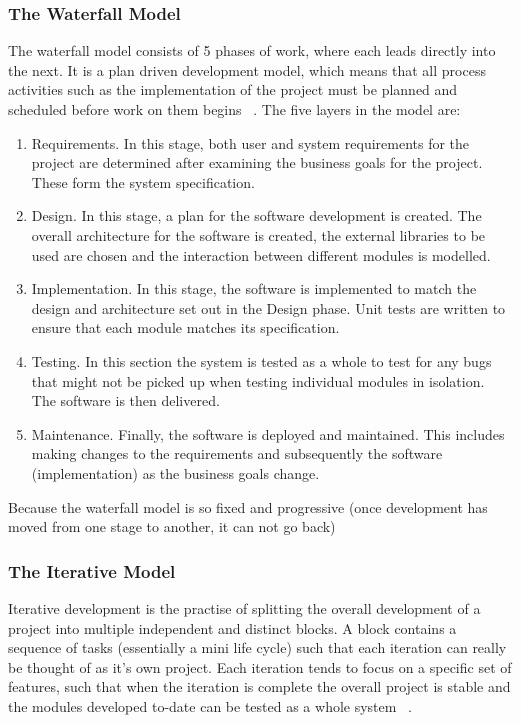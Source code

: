 \documentclass{article}
\begin{document}

\subsubsection{The Waterfall Model}
The waterfall model consists of 5 phases of work, where each leads directly into the next.  It is a plan driven development model, which means that all process activities such as the implementation of the project must be planned and scheduled before work on them begins ~\cite{sommervilleSoftwareEngineering}.  The five layers in the model are:
\begin{enumerate}
  \item Requirements.  In this stage, both user and system requirements for the project are determined after examining the business goals for the project.  These form the system specification.
  \item Design.  In this stage, a plan for the software development is created.  The overall architecture for the software is created, the external libraries to be used are chosen and the interaction between different modules is modelled.
  \item Implementation.  In this stage, the software is implemented to match the design and architecture set out in the Design phase.  Unit tests are written to ensure that each module matches its specification.
  \item Testing.  In this section the system is tested as a whole to test for any bugs that might not be picked up when testing individual modules in isolation.  The software is then delivered.
  \item Maintenance.  Finally, the software is deployed and maintained.  This includes making changes to the requirements and subsequently the software (implementation) as the business goals change.  ~\cite{sommervilleSoftwareEngineering}
\end{enumerate}

Because the waterfall model is so fixed and progressive (once development has moved from one stage to another, it can not go back)

\subsubsection{The Iterative Model}
Iterative development is the practise of splitting the overall development of a project into multiple independent and distinct blocks.  A block contains a sequence of tasks (essentially a mini life cycle) such that each iteration can really be thought of as it's own project.  Each iteration tends to focus on a specific set of features, such that when the iteration is complete the overall project is stable and the modules developed to-date can be tested as a whole system ~\cite{differenceBetweenLifeCycleModels}.
\end{document}
